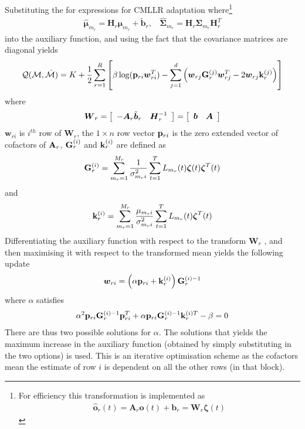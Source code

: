 Substituting the for expressions for CMLLR adaptation where\footnote{For
efficiency this transformation is implemented as
\begin{eqnarray}
\hat{\bm o}_r(t) = \bm{A}_r\bm{o}(t) + \bm{b}_r = \bm{W}_r\bm{\zeta}(t)
\end{eqnarray}
}
\begin{eqnarray}
\hat{\bm{\mu}}_{m_r} = \bm{H}_r\bm{\mu}_{m_r} + \tilde{\bm{b}}_r, \:\:\:\: 
\hat{\bm{\Sigma}}_{m_r} = {\bm H}_r{\bm{\Sigma}}_{m_r}{\bm H}_r^T
\end{eqnarray}
into the auxiliary function, and using the fact that the covariance
matrices are diagonal yields
\begin{eqnarray}
{\cal Q}({\cal M},{\hat{\cal M}}) = K + 
\frac{1}{2}
\sum_{r=1}^R\left[
\beta\log({\bf p}_{ri}{\mbox{\boldmath $w$}}_{ri}^T)-
\sum_{j=1}^d{
\left({\mbox{\boldmath $w$}}_{rj}{\bf G}^{(j)}_r{\mbox{\boldmath $w$}}^T_{rj} - 2{\mbox{\boldmath $w$}}_{rj}{\bf k}^{(j)}_r
\right)}\right] \nonumber
\end{eqnarray}
where 
\begin{eqnarray}
{\mbox{\boldmath $W$}}_r = \left[\begin{array}{c c}
-{\mbox{\boldmath $A$}}_r\tilde{{\mbox{\boldmath $b$}}}_r & {\mbox{\boldmath $H$}}_r^{-1} \end{array}
\right] =  \left[\begin{array}{c c}
{\mbox{\boldmath $b$}} & {\mbox{\boldmath $A$}} \end{array}
\right]
\end{eqnarray}
$\bm{w}_{ri}$ is $i^{th}$ row of $\bm{W}_r$, the $1\times n$ row vector ${\bf p}_{ri}$ is the zero  
extended vector of cofactors of ${\bf A}_r$, ${\bf G}^{(i)}_r$ and ${\bf k}^{(i)}_r$ are defined as
\begin{eqnarray}
{\bf G}^{(i)}_r=\sum_{m_r=1}^{M_r}
\frac{1}{\sigma_{m_ri}^{2}}
\sum_{t=1}^TL_{m_r}(t){{\mbox{\boldmath $\zeta$}}}(t){{\mbox{\boldmath $\zeta$}}}^{T}(t)
\label{eq:gi_mllr3}
\end{eqnarray}
and 
\begin{eqnarray}
{\bf k}^{(i)}_r=\sum_{m_r=1}^{M_r}
\frac{\mu_{m_ri}}{\sigma_{m_ri}^{2}}
\sum_{t=1}^TL_{m_r}(t){{\mbox{\boldmath $\zeta$}}}^{T}(t)
\label{eq:gi_mllr4}
\end{eqnarray}
Differentiating the auxiliary function with respect to the transform
$\bm{W}_r$ , and then maximising it with respect to the transformed mean
yields the following update
\begin{eqnarray}
{\mbox{\boldmath $w$}}_{ri} = \left(\alpha{{\bf p}_{ri}} + {\bf k}^{(i)}_r\right){\bf G}^{(i)-1}_r
\end{eqnarray}
where $\alpha$ satisfies
\begin{eqnarray}
\alpha^2{\bf p}_{ri}{\bf G}^{(i)-1}_r{\bf p}_{ri}^T +
\alpha{\bf p}_{ri}{\bf G}^{(i)-1}_r{\bf k}^{(i)T}_r - \beta=0\label{eq:alpha_quad}
\end{eqnarray}
There are thus two possible solutions for $\alpha$. The solutions that
yields the maximum increase in the auxiliary function (obtained by
simply substituting in the two options) is used. This is an iterative
optimisation scheme as the cofactors mean the estimate of row $i$ is
dependent on all the other rows (in that block).

